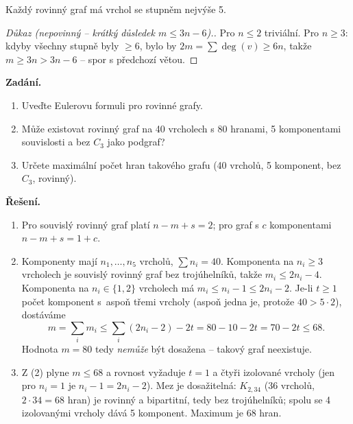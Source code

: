 \documentclass[11pt,a4paper]{article}
\begin{document}
\begin{dusledek}
Každý rovinný graf má vrchol se stupněm nejvýše 5.
\end{dusledek}

\begin{proof}[Důkaz \textnormal{(nepovinný -- krátký důsledek $m\le 3n-6$).}]
Pro $n\le 2$ triviální. Pro $n\ge 3$: kdyby všechny stupně byly $\ge 6$, bylo by $2m=\sum\deg(v)\ge 6n$, takže $m\ge 3n>3n-6$ -- spor s předchozí větou.
\end{proof}

\begin{priklad} \par
\textbf{Zadání.}
\begin{enumerate}[label=(\arabic*)]
  \item Uveďte Eulerovu formuli pro rovinné grafy.
  \item Může existovat rovinný graf na 40 vrcholech s 80 hranami, 5 komponentami souvislosti a bez $C_3$ jako podgraf?
  \item Určete maximální počet hran takového grafu (40 vrcholů, 5 komponent, bez $C_3$, rovinný).
\end{enumerate}

\textbf{Řešení.}
\begin{enumerate}[label=(\arabic*)]
  \item Pro souvislý rovinný graf platí $n-m+s=2$; pro graf s $c$ komponentami $n-m+s=1+c$.
  \item Komponenty mají $n_1,\dots,n_5$ vrcholů, $\sum n_i=40$. Komponenta na $n_i\ge 3$ vrcholech je souvislý rovinný graf bez trojúhelníků, takže $m_i\le 2n_i-4$. Komponenta na $n_i\in\{1,2\}$ vrcholech má $m_i\le n_i-1\le 2n_i-2$. Je-li $t\ge 1$ počet komponent s~aspoň třemi vrcholy (aspoň jedna je, protože $40>5\cdot 2$), dostáváme
  \[ m=\sum_i m_i\le\sum_i(2n_i-2)-2t=80-10-2t=70-2t\le 68. \]
  Hodnota $m=80$ tedy \emph{nemůže} být dosažena -- takový graf neexistuje.
  \item Z (2) plyne $m\le 68$ a rovnost vyžaduje $t=1$ a čtyři izolované vrcholy (jen pro $n_i=1$ je $n_i-1=2n_i-2$). Mez je dosažitelná: $K_{2,34}$ (36 vrcholů, $2\cdot 34=68$ hran) je rovinný a bipartitní, tedy bez trojúhelníků; spolu se 4 izolovanými vrcholy dává 5 komponent. Maximum je $\boxed{68}$ hran.
\end{enumerate}
\end{priklad}
\end{document}
